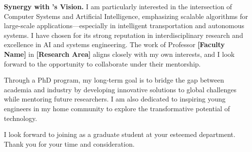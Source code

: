 
\textbf{Synergy with \GetUniversityName's Vision.}
I am particularly interested in the intersection of Computer Systems and Artificial Intelligence,
emphasizing scalable algorithms for large-scale applications—especially in intelligent transportation
and autonomous systems. I have chosen \textbf{\GetUniversityName} for its strong reputation in
interdisciplinary research and excellence in AI and systems engineering.
The work of Professor \textbf{[Faculty Name]} in \textbf{[Research Area]} aligns closely with my own
interests, and I look forward to the opportunity to collaborate under their mentorship.

Through a PhD program, my long-term goal is to bridge the gap between academia and industry by
developing innovative solutions to global challenges while mentoring future researchers.
I am also dedicated to inspiring young engineers in my home community to explore the transformative
potential of technology.

I look forward to joining \textbf \GetUniversityName as a graduate student at your esteemed department.
Thank you for your time and consideration.